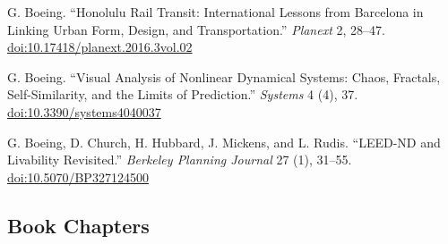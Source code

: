 \documentclass[11pt,letterpaper]{report} %
\begin{document}
\begin{tablist}
\item[2016] \tab{}G. Boeing. \enquote{Honolulu Rail Transit: International Lessons from Barcelona in Linking Urban Form, Design, and Transportation.} \textit{Planext} 2, 28--47. \href{https://doi.org/10.17418/planext.2016.3vol.02}{doi:10.17418/planext.2016.3vol.02}

\item[2016] \tab{}G. Boeing. \enquote{Visual Analysis of Nonlinear Dynamical Systems: Chaos, Fractals, Self-Similarity, and the Limits of Prediction.} \textit{Systems} 4 (4), 37. \href{https://doi.org/10.3390/systems4040037}{doi:10.3390/systems4040037}

\item[2014] \tab{}G. Boeing, D. Church, H. Hubbard, J. Mickens, and L. Rudis. \enquote{LEED-ND and Livability Revisited.} \textit{Berkeley Planning Journal} 27 (1), 31--55. \href{https://doi.org/10.5070/BP327124500}{doi:10.5070/BP327124500}

\end{tablist}

\subsection*{Book Chapters}
\end{document}
